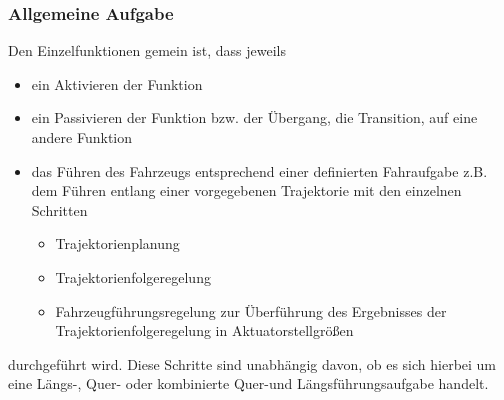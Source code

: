 \subsubsection*{Allgemeine Aufgabe}
Den Einzelfunktionen gemein ist, dass jeweils 
\begin{itemize}
\item ein Aktivieren der Funktion
\item ein Passivieren der Funktion bzw. der Übergang, die Transition, auf eine andere Funktion
\item das Führen des Fahrzeugs entsprechend einer definierten Fahraufgabe z.B. dem Führen entlang einer vorgegebenen Trajektorie mit den einzelnen Schritten
\begin{itemize}
\item Trajektorienplanung
\item Trajektorienfolgeregelung
\item Fahrzeugführungsregelung zur Überführung des Ergebnisses der Trajektorienfolgeregelung in Aktuatorstellgrößen
\end{itemize}
\end{itemize}
durchgeführt wird. Diese Schritte sind unabhängig davon, ob es sich hierbei um eine Längs-, Quer- oder kombinierte Quer-und Längsführungsaufgabe handelt.

